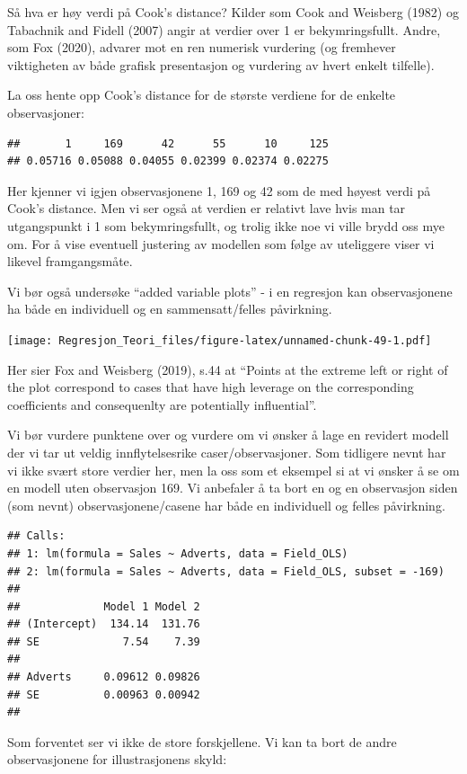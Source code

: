 \documentclass[
]{article}
\begin{document}
Så hva er høy verdi på Cook's distance? Kilder som Cook and Weisberg
(1982) og Tabachnik and Fidell (2007) angir at verdier over 1 er
bekymringsfullt. Andre, som Fox (2020), advarer mot en ren numerisk
vurdering (og fremhever viktigheten av både grafisk presentasjon og
vurdering av hvert enkelt tilfelle).

La oss hente opp Cook's distance for de største verdiene for de enkelte
observasjoner:

\begin{verbatim}
##       1     169      42      55      10     125 
## 0.05716 0.05088 0.04055 0.02399 0.02374 0.02275
\end{verbatim}

Her kjenner vi igjen observasjonene 1, 169 og 42 som de med høyest verdi
på Cook's distance. Men vi ser også at verdien er relativt lave hvis man
tar utgangspunkt i 1 som bekymringsfullt, og trolig ikke noe vi ville
brydd oss mye om. For å vise eventuell justering av modellen som følge
av uteliggere viser vi likevel framgangsmåte.

Vi bør også undersøke ``added variable plots'' - i en regresjon kan
observasjonene ha både en individuell og en sammensatt/felles
påvirkning.

\texttt{[image: Regresjon\_Teori\_files/figure-latex/unnamed-chunk-49-1.pdf]}

Her sier Fox and Weisberg (2019), s.44 at ``Points at the extreme left
or right of the plot correspond to cases that have high leverage on the
corresponding coefficients and consequenlty are potentially
influential''.

Vi bør vurdere punktene over og vurdere om vi ønsker å lage en revidert
modell der vi tar ut veldig innflytelsesrike caser/observasjoner. Som
tidligere nevnt har vi ikke svært store verdier her, men la oss som et
eksempel si at vi ønsker å se om en modell uten observasjon 169. Vi
anbefaler å ta bort en og en observasjon siden (som nevnt)
observasjonene/casene har både en individuell og felles påvirkning.

\begin{verbatim}
## Calls:
## 1: lm(formula = Sales ~ Adverts, data = Field_OLS)
## 2: lm(formula = Sales ~ Adverts, data = Field_OLS, subset = -169)
## 
##             Model 1 Model 2
## (Intercept)  134.14  131.76
## SE             7.54    7.39
##                            
## Adverts     0.09612 0.09826
## SE          0.00963 0.00942
## 
\end{verbatim}

Som forventet ser vi ikke de store forskjellene. Vi kan ta bort de andre
observasjonene for illustrasjonens skyld:
\end{document}
